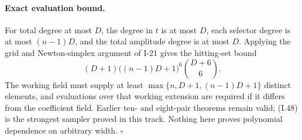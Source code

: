 \paragraph{Exact evaluation bound.}
For total degree at most $D$, the degree in $t$ is at most
$D$, each selector degree is at most $(n-1)D$, and the total
amplitude degree is at most $D$.  Applying the grid and
Newton-simplex argument of I-21 gives the hitting-set bound
\[
 (D+1)\bigl((n-1)D+1\bigr)^6\binom{D+6}{6}.
 \tag{I.49}
\]
The working field must supply at least
$\max\{n,D+1,(n-1)D+1\}$ distinct elements, and evaluations
over that working extension are required if it differs
from the coefficient field.  Earlier ten- and eight-pair
theorems remain valid; (I.48) is the strongest sampler
proved in this track.  Nothing here proves polynomial
dependence on arbitrary width.
\hfill$\square$
